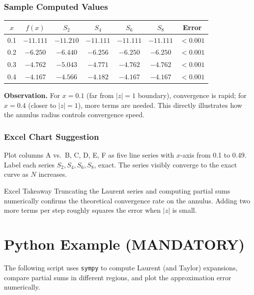 \documentclass[12pt,a4paper]{article}
\begin{document}
\subsubsection*{Sample Computed Values}

\begin{center}
\begin{tabular}{ccccccc}
\toprule
$x$ & $f(x)$ & $S_2$ & $S_4$ & $S_6$ & $S_8$ & Error \\
\midrule
0.1 & $-11.111$ & $-11.210$ & $-11.111$ & $-11.111$ & $-11.111$ & $< 0.001$ \\
0.2 & $-6.250$  & $-6.440$  & $-6.256$  & $-6.250$  & $-6.250$  & $< 0.001$ \\
0.3 & $-4.762$  & $-5.043$  & $-4.771$  & $-4.762$  & $-4.762$  & $< 0.001$ \\
0.4 & $-4.167$  & $-4.566$  & $-4.182$  & $-4.167$  & $-4.167$  & $< 0.001$ \\
\bottomrule
\end{tabular}
\end{center}

\noindent\textbf{Observation.} For $x = 0.1$ (far from $|z|=1$ boundary), convergence is rapid;
for $x = 0.4$ (closer to $|z|=1$), more terms are needed. This directly illustrates how the
annulus radius controls convergence speed.

\subsubsection*{Excel Chart Suggestion}

Plot columns A vs.\ B, C, D, E, F as five line series with $x$-axis from 0.1 to 0.49. Label
each series $S_2, S_4, S_6, S_8$, exact. The series visibly converge to the exact curve as $N$
increases.

\begin{learnbox}{Excel Takeaway}
Truncating the Laurent series and computing partial sums numerically confirms the theoretical
convergence rate on the annulus. Adding two more terms per step roughly squares the error when
$|z|$ is small.
\end{learnbox}

\section{Python Example (MANDATORY)}

The following script uses \texttt{sympy} to compute Laurent (and Taylor) expansions,
compare partial sums in different regions, and plot the approximation error numerically.
\end{document}
